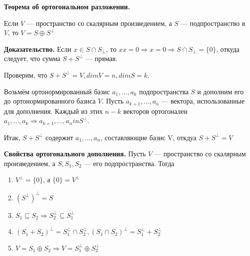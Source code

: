 \documentclass[a4paper]{article}
\begin{document}
    \newpage \begin{center}
                 \begin{Large}
                 \end{Large}
    \end{center}

    \begin{htheorem}
        \textbf{Теорема об ортогональном разложении.}

        Если $V$ --- пространство со скалярным произведением, а $S$ --- подпространство в $V$, то $V = S \oplus S^{\bot}$
    \end{htheorem}

    \begin{hproof}
        \textbf{Доказательство.} Если $x \in S \cap S_{\bot}$, то $xx=0 \Rightarrow x=0 \Rightarrow S \cap S_{\bot} = \{ 0 \}$, откуда следует, что сумма $S + S^{\bot}$ --- прямая.

        Проверим, что $S + S^{\bot} = V, dimV = n, dimS = k$.

        Возьмём ортонормированный базис $a_1, ..., a_k$ подпространства $S$ и дополним его до ортонормированного базиса $V$. Пусть $a_{k+1}, ..., a_n$ --- вектора, использованные для дополнения. Каждый из этих $n-k$ векторов ортогонален $a_1, ..., a_k \Rightarrow a_{k+1}, ..., a_n in S^{\bot}$.

        Итак,  $S + S^{\bot}$ содержит $a_1, ..., a_n$, составляющие базис V,  откдуа $S + S^{\bot} = V$
    \end{hproof}


    \begin{htheorem}
        \textbf{Свойства ортогонального дополнения.} Пусть $V$ --- пространство со скалярным произведением, а $S, S_1, S_2$ --- его подпространства. Тогда
        \begin{enumerate}
            \item $V^{\bot} = \{ 0 \}$, а $\{ 0 \} = V^{\bot}$
            \item $(S^{\bot})^{\bot} = S$
            \item $S_1 \subseteq S_2 \Rightarrow S_2^{\bot} \subseteq S_1^{\bot}$
            \item $(S_1+S_2)^{\bot} = S_1^{\bot} \cap S_2^{\bot}, (S_1 \cap S_2)^{\bot} = S_1^{\bot} + S_2^{\bot}$
            \item $V = S_1 \oplus S_2 \Rightarrow V = S_1^{\bot} \oplus S_2^{\bot}$
        \end{enumerate}
    \end{htheorem}
\end{document}
